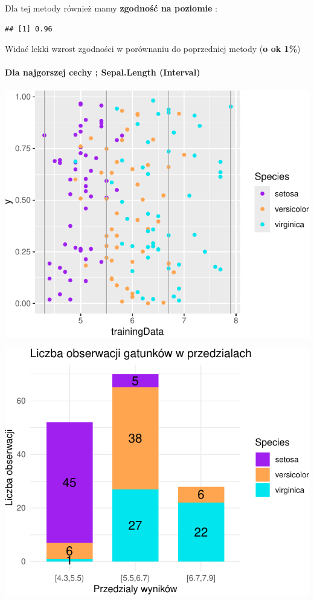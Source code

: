\documentclass[
  12pt,
]{article}
\begin{document}
Dla tej metody również mamy \textbf{zgodność na poziomie} :

\begin{verbatim}
## [1] 0.96
\end{verbatim}

Widać lekki wzrost zgodności w porównaniu do poprzedniej metody
(\textbf{o ok 1\%})

\paragraph{Dla najgorszej cechy ; Sepal.Length
(Interval)}\label{dla-najgorszej-cechy-sepal.length-interval}

\begin{center}\includegraphics{Sprawozdanie2_files/figure-latex/width_najg-1} \end{center}

\begin{center}\includegraphics{Sprawozdanie2_files/figure-latex/tabela_kondygnacji_2_najg-1} \end{center}
\end{document}
